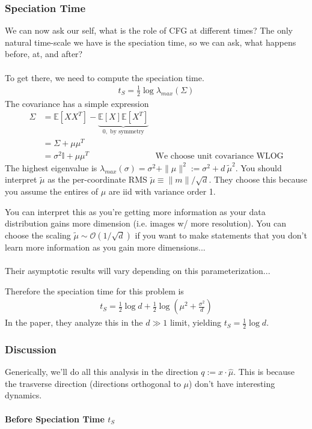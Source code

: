 \documentclass[12pt,fleqn]{article}
\numberwithin{equation}{section} %
\begin{document}
\subsubsection{Speciation Time}
We can now ask our self, what is the role of CFG at different times? The only natural time-scale we have is the speciation time, so we can ask, what happens before, at, and after?\\
\\
To get there, we need to compute the speciation time.
\begin{align}
	t_S = \frac{1}{2} \log \lambda_{max}(\Sigma)
\end{align}
The covariance has a simple expression
\begin{align}
	\Sigma & = \mathbb E[XX^T] - \underbrace{\mathbb E[X] \mathbb E[X^T]}_{0, \text{ by symmetry}}\\
	& = \Sigma + \mu \mu^T\\
	& = \sigma^2 \mathbb I + \mu \mu^T & \text{We choose unit covariance WLOG}
\end{align}
The highest eigenvalue is $\lambda_{max}(\sigma) = \sigma^2 + \| \mu\|^2 := \sigma^2 + d ~ \tilde \mu^2$. You should interpret $\tilde \mu$ as the per-coordinate RMS $\tilde \mu \equiv \| m \| / \sqrt{d}$. They choose this because you assume the entires of $\mu$ are iid with variance order 1. 
\begin{sidework}
	You can interpret this as you're getting more information as your data distribution gains more dimension (i.e. images w/ more resolution). You can choose the scaling $\tilde \mu \sim \mathcal O(1/\sqrt{d})$ if you want to make statements that you don't learn more information as you gain more dimensions...\\
	\\
	Their asymptotic results will vary depending on this parameterization...
\end{sidework}
Therefore the speciation time for this problem is 
\begin{align}
	t_S = \frac{1}{2} \log d + \frac{1}{2} \log \left(\mu^2 + \frac{\sigma^2}{d} \right)
\end{align}
In the paper, they analyze this in the $d \gg 1$ limit, yielding $t_S = \frac{1}{2 } \log d$.
\subsubsection{Discussion}
Generically, we'll do all this analysis in the direction $q := x \cdot \hat \mu$. This is because the trasverse direction (directions orthogonal to $\mu$) don't have interesting dynamics.\\
\\
\textbf{Before Speciation Time $t_S$}
\end{document}
